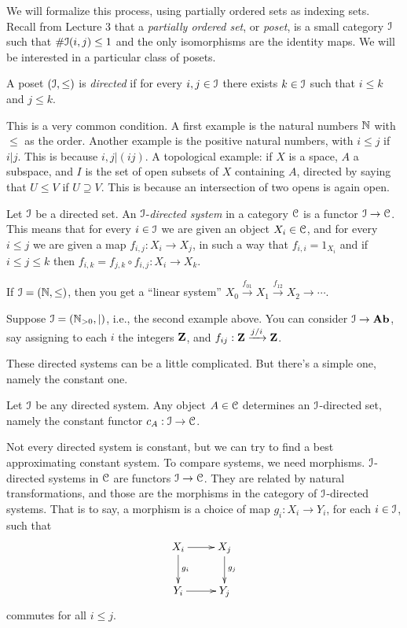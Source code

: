 We will formalize this process, using partially ordered sets as indexing sets.
Recall from Lecture 3 
that a {\em partially ordered set}, or {\em poset}, is a small category $\mathcal I$ such that $\#\mathcal I(i,j)\leq 1$ and the only isomorphisms are the identity maps. We will be interested in a particular class of posets.
\begin{definition}
A poset $(\mathcal I,\leq)$ is \emph{directed} if for every $i,j\in\mathcal I$
there exists  $k\in\mathcal I$ such that $i\leq k$ and $j\leq k$.
\end{definition}
\begin{example}
This is a very common condition.
A first example is the natural numbers $\mathbb N$ with $\leq$ as the order. Another example is the positive natural numbers, with $i\leq j$ if $i|j$. This is because $i,j|(ij)$. A topological example: if $X$ is a space, $A$ a subspace, and 
$I$ is the set of open subsets of $X$ containing $A$, directed by saying that $U\leq V$ if $U\supseteq V$. This is because an intersection of two opens is 
again open.
\end{example}
\begin{definition}
Let $\mathcal I$ be a directed set. An $\mathcal I$-{\em directed system} in  a category $\mathcal C$ is a functor $\mathcal I\to\mathcal C$. This means that for every $i\in \mathcal I$ we are given an object $X_i\in\mathcal C$, and for every $i\leq j$ we are given a map $f_{i,j}:X_i\to X_j$, in such a way that $f_{i,i}=1_{X_i}$ and if $i\leq j\leq k$
then $f_{i,k}=f_{j,k}\circ f_{i,j}:X_i\to X_k$. 
\end{definition}
\begin{example}\label{linear}
If $\mathcal I=(\mathbb N,\leq)$, then you get a ``linear system'' $X_0\xrightarrow{f_{01}}X_1\xrightarrow{f_{12}}X_2\to\cdots$. 
\end{example}
\begin{example}
Suppose $\mathcal I=(\mathbb N_{>0},|)$, i.e., the second example above. You can consider $\mathcal I\to\mathbf{Ab}$, say assigning to each $i$ the integers $\mathbf Z$, and $f_{ij}:\mathbf Z\xrightarrow{j/i}\mathbf Z$. 
\end{example}
These directed systems can be a little complicated. But there's a simple one, namely the constant one. 
\begin{example}
Let $\mathcal I$ be any directed system. Any object $A\in\mathcal C$ determines an $\mathcal I$-directed set, namely the constant functor $c_A:\mathcal I\to\mathcal C$.
\end{example}
Not every directed system is constant, but we can try to find a best approximating constant system. To compare systems, we need morphisms. 
$\mathcal I$-directed systems in $\mathcal C$ are functors $\mathcal I\to\mathcal C$. They are related by natural transformations, and those are the morphisms in the category of $\mathcal I$-directed systems. That is to say, a morphism is a choice of map $g_i:X_i\to Y_i$, for each $i\in\mathcal I$, such that 
\begin{equation*}
\xymatrix{X_i\ar[r]\ar[d]^{g_i} & X_j\ar[d]^{g_j}\\
Y_i\ar[r] & Y_j}
\end{equation*}
commutes for all $i\leq j$.

